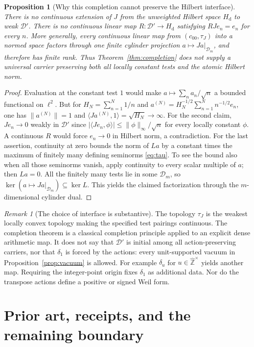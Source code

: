 \documentclass[11pt]{article}
\newtheorem{proposition}[theorem]{Proposition}
\theoremstyle{remark}
\newtheorem{remark}[theorem]{Remark}
\newcommand{\Zhat}{\widehat{\mathbb Z}}
\newcommand{\Hd}{H_{\mathrm d}}
\newcommand{\D}{\mathcal D}
\begin{document}
\begin{proposition}[Why this completion cannot preserve the Hilbert interface]\label{prop:hilbert}
There is no continuous extension of $J$ from the unweighted Hilbert space
$\Hd$ to weak $\D'$.  There is no continuous linear map
$R:\D'\to\Hd$ satisfying $RJe_n=e_n$ for every $n$.
More generally, every continuous linear map from $(c_{00},\tau_J)$ into
a normed space factors through one finite cylinder projection
$a\mapsto Ja|_{\D_m}$, and therefore has finite rank.
Thus Theorem~\ref{thm:completion} does not supply a universal carrier
preserving both all locally constant tests and the atomic Hilbert norm.
\end{proposition}
\begin{proof}
Evaluation at the constant test $1$ would make
$a\mapsto\sum_n a_n/\sqrt n$ a bounded functional on $\ell^2$.
But for $H_N=\sum_{n=1}^N1/n$ and
$a^{(N)}=H_N^{-1/2}\sum_{n=1}^N n^{-1/2}e_n$, one has
$\|a^{(N)}\|=1$ and $\langle Ja^{(N)},1\rangle=\sqrt{H_N}\to\infty$.
For the second claim, $Je_n\to0$ weakly in $\D'$ since
$|\langle Je_n,\phi\rangle|\leq\|\phi\|_\infty/\sqrt n$ for every
locally constant $\phi$.  A continuous $R$ would force $e_n\to0$ in
Hilbert norm, a contradiction.
For the last assertion, continuity at zero bounds the norm of $La$ by
a constant times the maximum of finitely many defining seminorms
\eqref{eq:tau}.  To see the bound also when all those seminorms vanish,
apply continuity to every scalar multiple of $a$; then $La=0$.
All the finitely many tests lie in some $\D_m$, so
$\ker(a\mapsto Ja|_{\D_m})\subseteq\ker L$.  This yields the claimed
factorization through the $m$-dimensional cylinder dual.
\end{proof}

\begin{remark}[The choice of interface is substantive]
The topology $\tau_J$ is the weakest locally convex topology making the
specified test pairings continuous.  The completion theorem is a
classical completion principle applied to an explicit dense arithmetic
map.  It does not say that $\D'$ is initial among all action-preserving
carriers, nor that $\delta_1$ is forced by the actions: every
unit-supported vacuum in Proposition~\ref{prop:vacuum} is allowed.
For example $\delta_u$ for $u\in\Zhat^\times$ yields another map.
Requiring the integer-point origin fixes $\delta_1$ as additional data.
Nor do the transpose actions define a positive or signed Weil form.
\end{remark}

\section{Prior art, receipts, and the remaining boundary}
\end{document}
